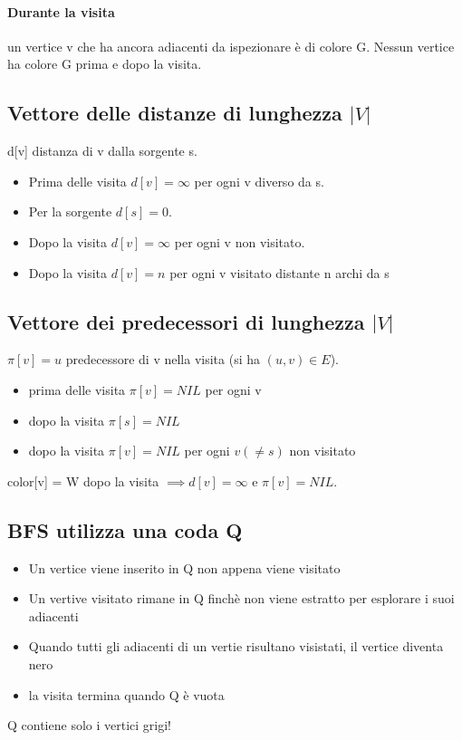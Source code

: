 \paragraph*{Durante la visita} un vertice v che ha ancora adiacenti da ispezionare è
di colore G. Nessun vertice ha colore G prima e dopo la visita.
\subsection*{Vettore delle distanze di lunghezza $|V|$}
d[v] \ra distanza di v dalla sorgente s.
\begin{itemize}
    \item Prima delle visita \ra $d[v] = \infty$ per ogni v diverso da s.
    \item Per la sorgente \ra $d[s] = 0$.
    \item Dopo la visita \ra $d[v] = \infty$ per ogni v non visitato.
    \item Dopo la visita \ra $d[v] = n$ per ogni v visitato distante n archi da s
\end{itemize}
\subsection*{Vettore dei predecessori di lunghezza $|V|$}
$\pi[v]=u$ \ra predecessore di v nella visita (si ha $(u,v)\in E$).
\begin{itemize}
    \item prima delle visita \ra $\pi[v] = NIL$ per ogni v
    \item dopo la visita \ra $\pi[s] = NIL$
    \item dopo la visita \ra $\pi[v] = NIL$ per ogni $v (\neq s)$ non visitato
\end{itemize}
\begin{box_giallochiaro}
    {color[v] = W dopo la visita $\implies d[v] = \infty$ e $\pi[v]=NIL$}.
\end{box_giallochiaro}
\subsection{BFS utilizza una coda Q}
\begin{itemize}
    \item Un vertice viene inserito in Q non appena viene visitato
    \item Un vertive visitato rimane in Q finchè non viene estratto per esplorare
    i suoi adiacenti
    \item Quando tutti gli adiacenti di un vertie risultano visistati, il vertice
    diventa nero
    \item la visita termina quando Q è vuota
\end{itemize}
Q contiene solo i vertici grigi!
